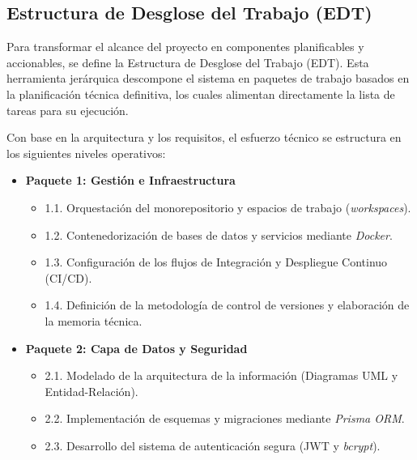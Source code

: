 \subsection{Estructura de Desglose del Trabajo (EDT)}

Para transformar el alcance del proyecto en componentes planificables y accionables, se define la Estructura de Desglose del Trabajo (EDT). Esta herramienta jerárquica descompone el sistema en paquetes de trabajo basados en la planificación técnica definitiva, los cuales alimentan directamente la lista de tareas para su ejecución.

Con base en la arquitectura y los requisitos, el esfuerzo técnico se estructura en los siguientes niveles operativos:

 \begin{itemize}

\item \textbf{Paquete 1: Gestión e Infraestructura}

\begin{itemize}

\item 1.1. Orquestación del monorepositorio y espacios de trabajo (\textit{workspaces}).

\item 1.2. Contenedorización de bases de datos y servicios mediante \textit{Docker}.

\item 1.3. Configuración de los flujos de Integración y Despliegue Continuo (CI/CD).

\item 1.4. Definición de la metodología de control de versiones y elaboración de la memoria técnica.

\end{itemize}


\item \textbf{Paquete 2: Capa de Datos y Seguridad}

\begin{itemize}

\item 2.1. Modelado de la arquitectura de la información (Diagramas UML y Entidad-Relación).

\item 2.2. Implementación de esquemas y migraciones mediante \textit{Prisma ORM}.

\item 2.3. Desarrollo del sistema de autenticación segura (JWT y \textit{bcrypt}).


\end{itemize}
\end{itemize}
